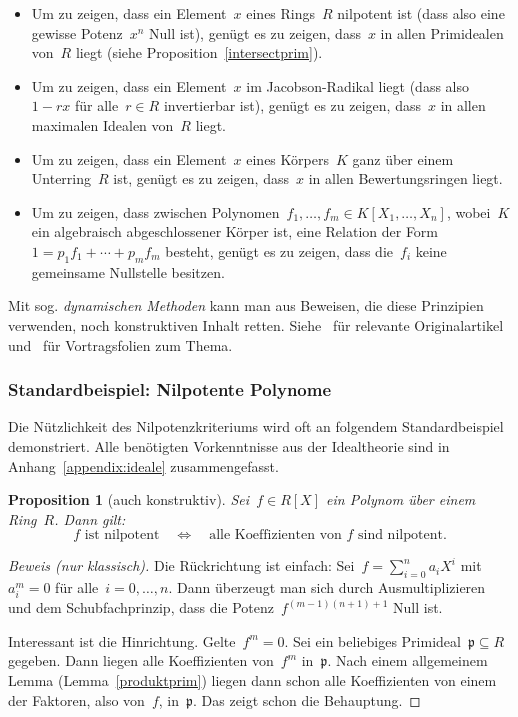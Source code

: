 \documentclass[a4paper,ngerman,12pt]{scrartcl}
\theoremstyle{definition}
\theoremstyle{plain}
\newtheorem{prop}[defn]{Proposition}
\theoremstyle{remark}
\newcommand{\pp}{\mathfrak{p}}
\renewcommand{\_}{\mathpunct{.}\,}
\newcommand{\?}{\,{:}\,}
\begin{document}
\begin{itemize}
\item Um zu zeigen, dass ein Element~$x$ eines Rings~$R$ nilpotent ist (dass
also eine gewisse Potenz~$x^n$ Null ist), genügt es zu zeigen, dass~$x$ in
allen Primidealen von~$R$ liegt (siehe Proposition~\ref{intersectprim}).
\item Um zu zeigen, dass ein Element~$x$ im Jacobson-Radikal liegt (dass
also~$1-rx$ für alle~$r \in R$ invertierbar ist), genügt es zu zeigen, dass~$x$
in allen maximalen Idealen von~$R$ liegt.
\item Um zu zeigen, dass ein Element~$x$ eines Körpers~$K$ ganz über einem
Unterring~$R$ ist, genügt es zu zeigen, dass~$x$ in allen Bewertungsringen
liegt.
\item Um zu zeigen, dass zwischen Polynomen~$f_1,\ldots,f_m \in
K[X_1,\ldots,X_n]$, wobei~$K$ ein algebraisch abgeschlossener Körper ist, eine
Relation der Form~$1 = p_1 f_1 + \cdots + p_m f_m$ besteht, genügt es zu
zeigen, dass die~$f_i$ keine gemeinsame Nullstelle besitzen.
\end{itemize}

Mit sog. \emph{dynamischen Methoden} kann man aus Beweisen, die diese
Prinzipien verwenden, noch konstruktiven Inhalt retten.
Siehe~\cite{clr:dynamicalmethod,cl:logical} für relevante Originalartikel
und~\cite{coquand:sitesur,lombardi:hilbertworks} für Vortragsfolien zum Thema.


\subsubsection*{Standardbeispiel: Nilpotente Polynome}
\label{bsp:nilpotentepolynome}

Die Nützlichkeit des Nilpotenzkriteriums wird oft an folgendem Standardbeispiel
demonstriert. Alle benötigten Vorkenntnisse aus der Idealtheorie sind in
Anhang~\ref{appendix:ideale} zusammengefasst.

\begin{prop}[auch konstruktiv]Sei~$f \in R[X]$ ein Polynom über einem Ring~$R$. Dann gilt:
\[ \text{$f$ ist nilpotent} \quad\Longleftrightarrow\quad
  \text{alle Koeffizienten von~$f$ sind nilpotent}. \]
\end{prop}
\begin{proof}[Beweis (nur klassisch)]Die Rückrichtung ist einfach: Sei~$f = \sum_{i=0}^n a_i X^i$
mit~$a_i^m = 0$ für alle~$i = 0,\ldots,n$. Dann überzeugt man sich durch
Ausmultiplizieren und dem Schubfachprinzip, dass die Potenz~$f^{(m-1)(n+1) +
1}$ Null ist.

Interessant ist die Hinrichtung. Gelte~$f^m = 0$. Sei ein beliebiges
Primideal~$\pp \subseteq R$ gegeben. Dann liegen alle Koeffizienten von~$f^m$
in~$\pp$. Nach einem allgemeinem Lemma (Lemma~\ref{produktprim}) liegen dann
schon alle Koeffizienten von einem der Faktoren, also von~$f$, in~$\pp$. Das
zeigt schon die Behauptung.
\end{proof}
\end{document}
